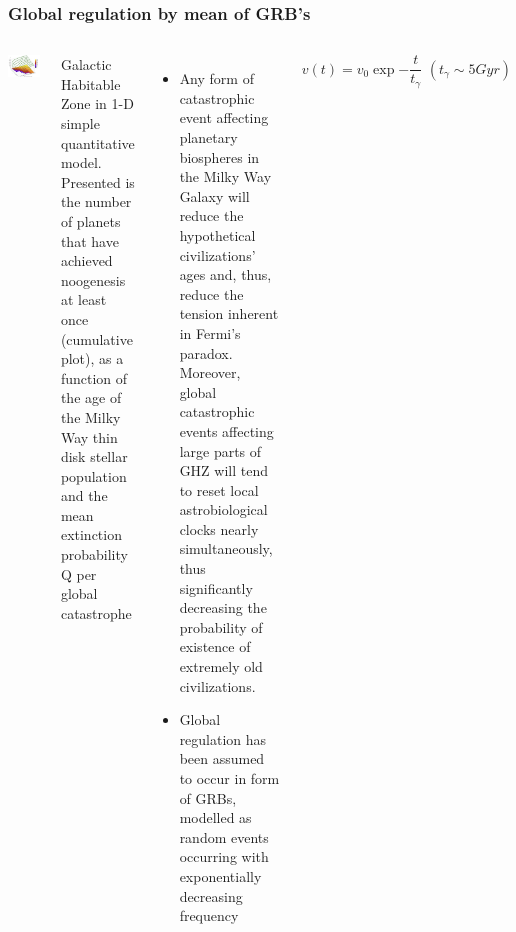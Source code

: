 \begin{frame}
\frametitle{Global regulation by mean of GRB's}

\begin{columns}
\includegraphics[scale=0.46]{extinction}

Galactic Habitable Zone in 1-D simple quantitative model. Presented is the number of planets that
have achieved noogenesis at least once (cumulative plot), as a function of the age of the Milky Way thin disk
stellar population and the mean extinction probability Q per global catastrophe
\begin{itemize}

\item Any form of catastrophic event affecting planetary biospheres
in the Milky Way Galaxy will reduce the hypothetical civilizations’ ages and, thus, reduce
the tension inherent in Fermi’s paradox. Moreover, global catastrophic events affecting
large parts of GHZ will tend to reset local astrobiological clocks nearly
simultaneously, thus significantly decreasing the probability of existence of extremely old
civilizations.

\item Global regulation has been assumed to occur in form of GRBs, modelled as random
events occurring with exponentially decreasing frequency
\end{itemize}
$$ v(t) = v_0 \exp{-\frac{t}{t_\gamma}}\, \, (t_\gamma  \sim 5 Gyr)$$


\end{columns}

\end{frame}

